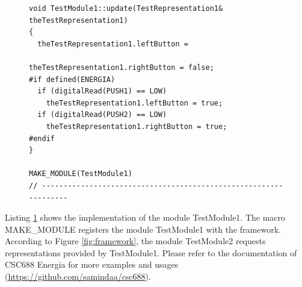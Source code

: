 \documentclass{llncs}
\begin{document}
\begin{sloppy}
\begin{figure}[!ht]
\begin{center}
\begin{verbatim}
void TestModule1::update(TestRepresentation1& theTestRepresentation1)
{
  theTestRepresentation1.leftButton = 
                          theTestRepresentation1.rightButton = false;
#if defined(ENERGIA)
  if (digitalRead(PUSH1) == LOW)
    theTestRepresentation1.leftButton = true;
  if (digitalRead(PUSH2) == LOW)
    theTestRepresentation1.rightButton = true;
#endif
}

MAKE_MODULE(TestModule1)
// -----------------------------------------------------------------
\end{verbatim}
\end{center}
\label{list:TestModule1.cpp}
\end{figure}


Listing \ref{list:TestModule1.cpp} shows the implementation of the module {\sf TestModule1}.  The
macro {\sf MAKE\_MODULE} registers the module {\sf TestModule1} with the framework. According to
Figure \ref{fig:framework}, the module {\sf TestModule2} requests representations provided by {\sf
TestModule1}. Please refer to the documentation of CSC688 Energia for more examples and usages
(\url{https://github.com/samindaa/csc688}).  




\end{sloppy}
\end{document}
